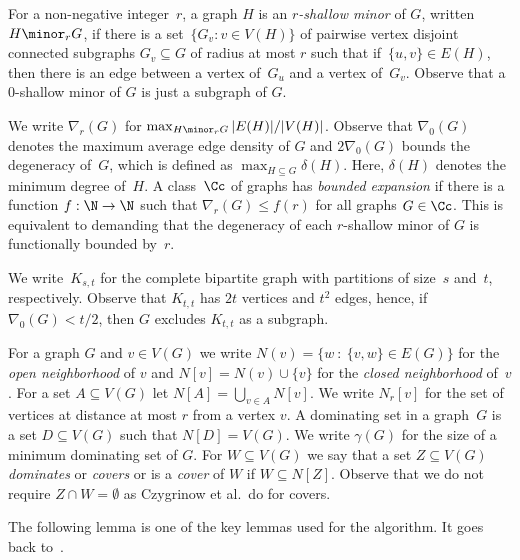For a non-negative integer~$r$, a graph
$H$ is an \emph{$r$-shallow minor} of $G$, written
$H\minor_r G$, if there is a set~$\{G_v : v\in V(H)\}$ of pairwise
vertex disjoint connected subgraphs
$G_v\subseteq G$ of radius at most $r$ such that if~$\{u,v\}\in E(H)$,
then there is an edge between a vertex of~$G_u$ and a vertex of~$G_v$.
Observe that a $0$-shallow minor of $G$ is just a subgraph of $G$.

We write $\nabla_r(G)$ for $\max_{H\minor_r G}|E(H)|/|V(H)|$. Observe
that $\nabla_0(G)$ denotes the maximum average edge density of $G$
and $2\nabla_0(G)$ bounds the degeneracy of~$G$, which is defined
as $\max_{H\subseteq G}\delta(H)$. Here, $\delta(H)$ denotes
the minimum degree of~$H$.
%
A class~$\Cc$ of graphs has \emph{bounded expansion} if there is a function
$f:\N\rightarrow\N$ such that $\nabla_r(G)\leq f(r)$ for all graphs $G\in \Cc$.
This is equivalent to demanding that the degeneracy of each $r$-shallow minor
of $G$ is functionally bounded by~$r$.

We write~$K_{s,t}$ for the complete bipartite
graph with partitions of size~$s$ and~$t$, respectively. Observe that
$K_{t,t}$ has $2t$ vertices and $t^2$ edges, hence, if
\mbox{$\nabla_0(G)< t/2$}, then $G$ excludes $K_{t,t}$ as a subgraph.

For a graph $G$ and $v\in V(G)$ we write $N(v)=\{w~:~\{v,w\}\in E(G)\}$
for the \emph{open neighborhood} of $v$ and $N[v]=N(v)\cup\{v\}$ for
the \emph{closed neighborhood} of~$v$. For a set $A\subseteq V(G)$ let
$N[A]=\bigcup_{v\in A}N[v]$. We write $N_r[v]$ for the set
of vertices at distance at most $r$ from a vertex $v$.
A dominating set in a graph~$G$ is a set
$D\subseteq V(G)$ such that $N[D]=V(G)$. We write $\gamma(G)$ for
the size of a minimum dominating set of $G$. For $W\subseteq V(G)$
we say that a set $Z\subseteq V(G)$ \emph{dominates} or \emph{covers} or
is a \emph{cover} of $W$ if $W\subseteq N[Z]$.
Observe that we do not
require $Z\cap W=\emptyset$ as Czygrinow et al.\ do for covers.

\smallskip
The following lemma is one of the key lemmas used for the algorithm. It goes back to~\cite{lenzen2013distributed}.

